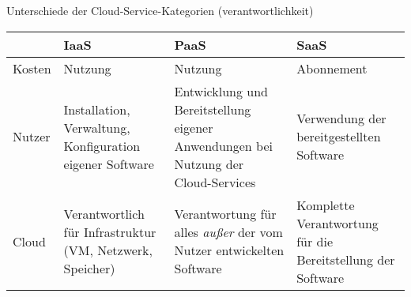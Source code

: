 \begin{flashcard}[\ ]{Unterschiede der Cloud-Service-Kategorien (verantwortlichkeit)}
    \begin{tabular}{l|p{34mm}p{34mm}p{34mm}}
                & \textbf{IaaS}                                             & \textbf{PaaS}                                                                     & \textbf{SaaS} \\
        \hline
        Kosten & Nutzung                                                   & Nutzung                                                                           & Abonnement                                                  \\
        Nutzer & Installation, Verwaltung, Konfiguration eigener Software  & Entwicklung und Bereitstellung eigener Anwendungen bei Nutzung der Cloud-Services & Verwendung der bereitgestellten Software                    \\
        Cloud  & Verantwortlich für Infrastruktur (VM, Netzwerk, Speicher) & Verantwortung für alles \emph{außer} der vom Nutzer entwickelten Software         & Komplette Verantwortung für die Bereitstellung der Software \\
    \end{tabular}
\end{flashcard}
